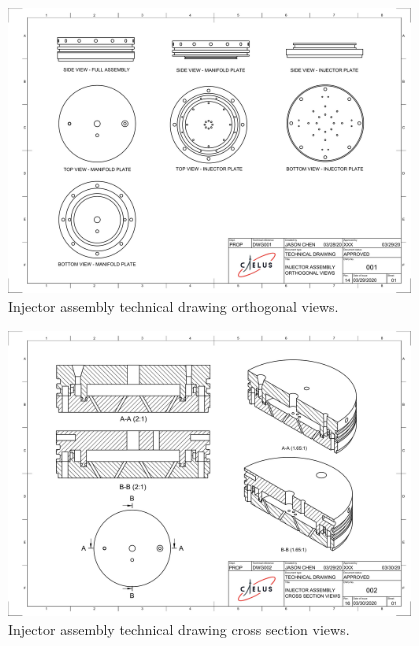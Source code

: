 \documentclass[9pt]{article} %
\numberwithin{equation}{section} %
\begin{document}
\begin{figure}
\centering
\includegraphics[scale=0.5, width=0.95\textwidth, clip]{Injector Assembly DWG001.pdf} %
\caption{Injector assembly technical drawing orthogonal views.}
\label{fig:injector_orthogonal}
\end{figure}

\begin{figure}
\centering
\includegraphics[scale=0.5, width=0.95\textwidth, clip]{Injector Assembly DWG002.pdf} %
\caption{Injector assembly technical drawing cross section views.}
\label{fig:injector_cross_section}
\end{figure}
\end{document}
